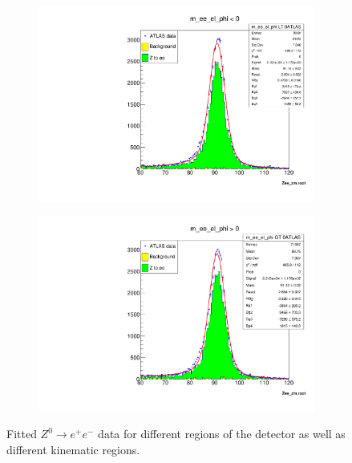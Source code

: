 \begin{figure}
\begin{subfigure}{0.5\textwidth}
            \includegraphics[width=\textwidth]{../W_mass/Z_mass_check_phi_negative.pdf}
        \end{subfigure}
        \begin{subfigure}{0.5\textwidth}
            \includegraphics[width=\textwidth]{../W_mass/Z_mass_check_phi_positive.pdf}
        \end{subfigure}
        \caption{Fitted $Z^0 \rightarrow e^+e^-$ data for different regions of the detector as well as different kinematic regions.}
        \label{fig:z-mass_check2}
    \end{figure}



